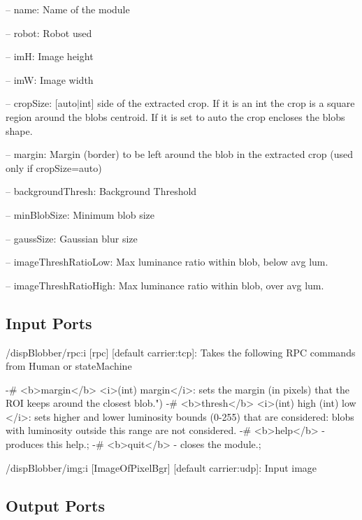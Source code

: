 \begin{DoxyItemize}
\item -- name\+: Name of the module
\item -- robot\+: Robot used
\item -- imH\+: Image height
\item -- imW\+: Image width
\item -- crop\+Size\+: \mbox{[}auto$\vert$int\mbox{]} side of the extracted crop. If it is an int the crop is a square region around the blob\textquotesingle{}s centroid. If it is set to \textquotesingle{}auto\textquotesingle{} the crop encloses the blob\textquotesingle{}s shape.
\item -- margin\+: Margin (border) to be left around the blob in the extracted crop (used only if crop\+Size=\textquotesingle{}auto\textquotesingle{})
\item -- background\+Thresh\+: Background Threshold
\item -- min\+Blob\+Size\+: Minimum blob size
\item -- gauss\+Size\+: Gaussian blur size
\item -- image\+Thresh\+Ratio\+Low\+: Max luminance ratio within blob, below avg lum.
\item -- image\+Thresh\+Ratio\+High\+: Max luminance ratio within blob, over avg lum. 
\end{DoxyItemize}\hypertarget{group__lbpExtract_inputports_sec}{}\subsection{Input Ports}\label{group__lbpExtract_inputports_sec}

\begin{DoxyItemize}
\item /disp\+Blobber/rpc\+:i \mbox{[}rpc\mbox{]} \mbox{[}default carrier\+:tcp\mbox{]}\+: Takes the following R\+PC commands from Human or state\+Machine \begin{DoxyVerb}       -# <b>margin</b> <i>(int) margin</i>: sets the margin (in pixels) that the ROI keeps around the closest blob.")
       -# <b>thresh</b> <i>(int) high (int) low </i>: sets higher and lower luminosity bounds (0-255) that are considered: blobs with luminosity outside this range are not considered.
       -# <b>help</b> - produces this help.;
       -# <b>quit</b> - closes the module.;
\end{DoxyVerb}

\item /disp\+Blobber/img\+:i \mbox{[}Image\+Of\+Pixel\+Bgr\mbox{]} \mbox{[}default carrier\+:udp\mbox{]}\+: Input image
\end{DoxyItemize}\hypertarget{group__lbpExtract_outputports_sec}{}\subsection{Output Ports}\label{group__lbpExtract_outputports_sec}

